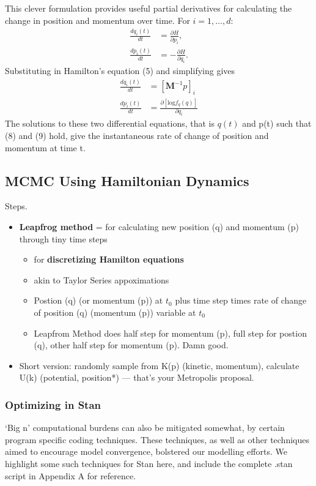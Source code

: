 \documentclass{article}
\begin{document}
This clever formulation provides useful partial derivatives for calculating the change in position and momentum over time. For $i = 1,\dots, d$:
\begin{align}
\frac{d q_{i}(t)}{dt} &= \frac{\partial H}{\partial p_{i}}, \\
\frac{d p_{i}(t)}{dt} &= -\frac{\partial H}{\partial q_{i}}.
\end{align}
Substituting in Hamilton's equation (5) and simplifying gives
\begin{align}
\frac{d q_{i}(t)}{dt} &=  [\pmb{M}^{-1}p]_{i} \\
\frac{d p_{i}(t)}{dt} &= \frac {\partial \left[ \text{log}f_{q}(q) \right]}{\partial q_{i}}
\end{align}
The solutions to these two differential equations, that is $q(t)$ and p(t) such that (8) and (9) hold, give the instantaneous rate of change of position and momentum at time t. 

\subsection*{MCMC Using Hamiltonian Dynamics \citep{Neal2011}}
Steps.

\begin{itemize}

\item {\bf Leapfrog method} = for calculating new position (q) and momentum (p) through tiny time steps
  \begin{itemize}
  \item for {\bf discretizing Hamilton equations}
  \item akin to Taylor Series appoximations
  \item Postion (q) (or momentum (p)) at $t_{0}$ plus time step times rate of change of position (q) (momentum (p)) variable at $t_{0}$
  \item Leapfrom Method does half step for momentum (p), full step for postion (q), other half step for momentum (p). Damn good.

  \end{itemize}

\item Short version: randomly sample from K(p) (kinetic, momentum), calculate U(k) (potential, position*) --- that's your Metropolis proposal.
\end{itemize}


\subsubsection{Optimizing in Stan}
`Big n' computational burdens can also be mitigated somewhat, by certain program specific coding techniques. These techniques, as well as other techniques aimed to encourage model convergence, bolstered our modelling efforts. We highlight some such techniques for Stan here, and include the complete .stan script in Appendix A for reference. 
\end{document}

